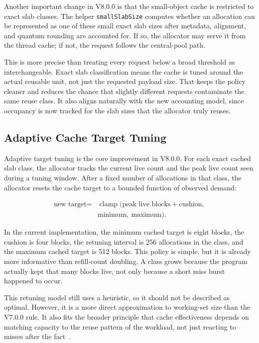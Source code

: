 Another important change in V8.0.0 is that the small-object cache is restricted to exact slab classes. The
helper \texttt{smallSlabSize} computes whether an allocation can be represented as one of these small exact
slab sizes after metadata, alignment, and quantum rounding are accounted for. If so, the allocator may serve it
from the thread cache; if not, the request follows the central-pool path.

This is more precise than treating every request below a broad threshold as interchangeable. Exact slab
classification means the cache is tuned around the actual reusable unit, not just the requested payload size.
That keeps the policy cleaner and reduces the chance that slightly different requests contaminate the same
reuse class. It also aligns naturally with the new accounting model, since occupancy is now tracked for the
slab sizes that the allocator truly reuses.

\subsection{Adaptive Cache Target Tuning}

Adaptive target tuning is the core improvement in V8.0.0. For each exact cached slab class, the allocator
tracks the current live count and the peak live count seen during a tuning window. After a fixed number of
allocations in that class, the allocator resets the cache target to a bounded function of observed demand:

\begin{equation}
\begin{aligned}
\text{new target} = {}& \operatorname{clamp}(\text{peak live blocks} + \text{cushion},\\
& \text{minimum},\ \text{maximum}).
\end{aligned}
\end{equation}

In the current implementation, the minimum cached target is eight blocks, the cushion is four blocks,
the retuning interval is 256 allocations in the class, and the maximum cached target is 512 blocks. This
policy is simple, but it is already more informative than refill-count doubling. A class grows because the
program actually kept that many blocks live, not only because a short miss burst happened to occur.

This retuning model still uses a heuristic, so it should not be described as optimal. However, it is a more
direct approximation to working-set size than the V7.0.0 rule. It also fits the broader principle that cache
effectiveness depends on matching capacity to the reuse pattern of the workload, not just reacting to misses
after the fact~\cite{hennessy2019}.

